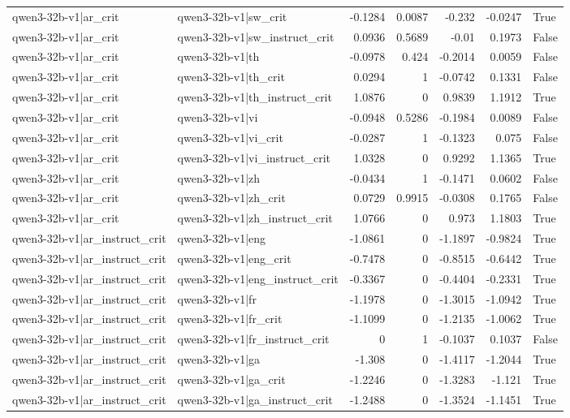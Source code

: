 \begin{table}
\begin{tabular}{l l r r r r l}
qwen3-32b-v1|ar_crit & qwen3-32b-v1|sw_crit & -0.1284 & 0.0087 & -0.232 & -0.0247 & True \\
qwen3-32b-v1|ar_crit & qwen3-32b-v1|sw_instruct_crit & 0.0936 & 0.5689 & -0.01 & 0.1973 & False \\
qwen3-32b-v1|ar_crit & qwen3-32b-v1|th & -0.0978 & 0.424 & -0.2014 & 0.0059 & False \\
qwen3-32b-v1|ar_crit & qwen3-32b-v1|th_crit & 0.0294 & 1 & -0.0742 & 0.1331 & False \\
qwen3-32b-v1|ar_crit & qwen3-32b-v1|th_instruct_crit & 1.0876 & 0 & 0.9839 & 1.1912 & True \\
qwen3-32b-v1|ar_crit & qwen3-32b-v1|vi & -0.0948 & 0.5286 & -0.1984 & 0.0089 & False \\
qwen3-32b-v1|ar_crit & qwen3-32b-v1|vi_crit & -0.0287 & 1 & -0.1323 & 0.075 & False \\
qwen3-32b-v1|ar_crit & qwen3-32b-v1|vi_instruct_crit & 1.0328 & 0 & 0.9292 & 1.1365 & True \\
qwen3-32b-v1|ar_crit & qwen3-32b-v1|zh & -0.0434 & 1 & -0.1471 & 0.0602 & False \\
qwen3-32b-v1|ar_crit & qwen3-32b-v1|zh_crit & 0.0729 & 0.9915 & -0.0308 & 0.1765 & False \\
qwen3-32b-v1|ar_crit & qwen3-32b-v1|zh_instruct_crit & 1.0766 & 0 & 0.973 & 1.1803 & True \\
qwen3-32b-v1|ar_instruct_crit & qwen3-32b-v1|eng & -1.0861 & 0 & -1.1897 & -0.9824 & True \\
qwen3-32b-v1|ar_instruct_crit & qwen3-32b-v1|eng_crit & -0.7478 & 0 & -0.8515 & -0.6442 & True \\
qwen3-32b-v1|ar_instruct_crit & qwen3-32b-v1|eng_instruct_crit & -0.3367 & 0 & -0.4404 & -0.2331 & True \\
qwen3-32b-v1|ar_instruct_crit & qwen3-32b-v1|fr & -1.1978 & 0 & -1.3015 & -1.0942 & True \\
qwen3-32b-v1|ar_instruct_crit & qwen3-32b-v1|fr_crit & -1.1099 & 0 & -1.2135 & -1.0062 & True \\
qwen3-32b-v1|ar_instruct_crit & qwen3-32b-v1|fr_instruct_crit & 0 & 1 & -0.1037 & 0.1037 & False \\
qwen3-32b-v1|ar_instruct_crit & qwen3-32b-v1|ga & -1.308 & 0 & -1.4117 & -1.2044 & True \\
qwen3-32b-v1|ar_instruct_crit & qwen3-32b-v1|ga_crit & -1.2246 & 0 & -1.3283 & -1.121 & True \\
qwen3-32b-v1|ar_instruct_crit & qwen3-32b-v1|ga_instruct_crit & -1.2488 & 0 & -1.3524 & -1.1451 & True \\

\end{tabular}
\end{table}
